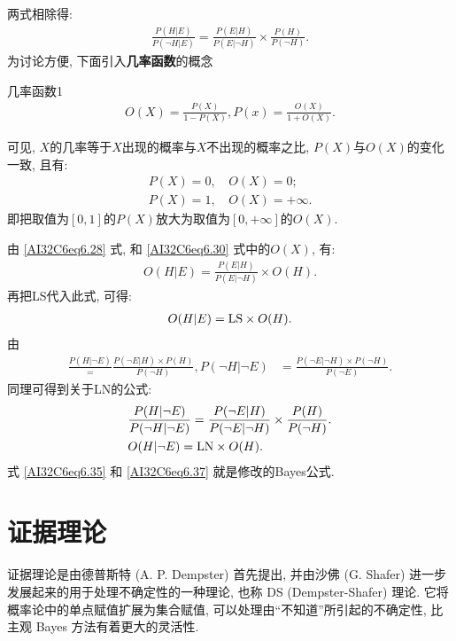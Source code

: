 两式相除得:
\begin{align}\label{AI32C6eq6.28}
    \frac{P(H | E)}{P(\neg H | E)}=\frac{P(E | H)}{P(E | \neg H)} \times \frac{P(H)}{P(\neg H)}.
\end{align}
为讨论方便, 下面引入\textbf{几率函数}的概念
\begin{mydef}{几率函数}{1}
\begin{align}\label{AI32C6eq6.30}
    O(X)=\frac{P(X)}{1-P(X)}, P(x)=\frac{O(X)}{1+O( X)}.
\end{align}
\end{mydef}

可见, $X$的几率等于$X$出现的概率与$X$不出现的概率之比, $P(X)$与$O(X)$的变化一致, 且有:
\begin{align}
    P(X)=0,&\,O(X)=0;\\
    P(X)=1,&\,O(X)=+\infty.
\end{align}
即把取值为$[0,1]$的$P(X)$放大为取值为$[0,+\infty]$的$O(X)$.

由 \eqref{AI32C6eq6.28} 式, 和 \eqref{AI32C6eq6.30} 式中的$O(X)$, 有:
\begin{align}
    O(H | E)=\frac{P(E | H)}{P(E | \neg H)} \times O(H).
\end{align}
再把LS代入此式, 可得:
\begin{align}\label{AI32C6eq6.35}
    O(H | E)=\textup{LS} \times O(H).
\end{align}
由
\begin{align}
  \frac{P(H|\neg E)}=\frac{P(\neg E | H) \times P(H)}{P(\neg H)},  P(\neg H | \neg E) &=\frac{P(\neg E | \neg H) \times P(\neg H)}{P(\neg E)}.
\end{align}
同理可得到关于LN的公式:
\begin{align}
    &\frac{P(H|\neg E)}{P(\neg H|\neg E)}=\frac{P(\neg E | H)}{P(\neg E |\neg H)} \times \frac{P(H)}{P(\neg H)}.\label{AI32C6eq6.36} \\
    &O(H| \neg E)=\textup{LN} \times O(H). \label{AI32C6eq6.37}
\end{align}
式 \eqref{AI32C6eq6.35} 和 \eqref{AI32C6eq6.37} 就是修改的Bayes公式.
\section{证据理论}
证据理论是由德普斯特 (A. P. Dempster) 首先提出, 并由沙佛 (G. Shafer) 进一步发展起来的用于处理不确定性的一种理论, 也称 DS (Dempster-Shafer) 理论.
它将概率论中的单点赋值扩展为集合赋值, 可以处理由“不知道”所引起的不确定性, 比主观 Bayes 方法有着更大的灵活性.
